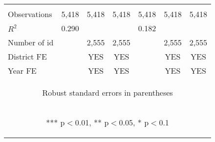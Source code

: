 \begin{center}
\begin{tabular}{lcccccc}
\vspace{4pt} & \begin{footnotesize}\end{footnotesize} & \begin{footnotesize}\end{footnotesize} & \begin{footnotesize}\end{footnotesize} & \begin{footnotesize}\end{footnotesize} & \begin{footnotesize}\end{footnotesize} & \begin{footnotesize}\end{footnotesize} \\
Observations & 5,418 & 5,418 & 5,418 & 5,418 & 5,418 & 5,418 \\
$R^2$ & 0.290 &  &  & 0.182 &  &  \\
Number of id &  & 2,555 & 2,555 &  & 2,555 & 2,555 \\
District FE &  & YES & YES &  & YES & YES \\
 Year FE &  & YES & YES &  & YES & YES \\ \hline
\multicolumn{7}{c}{\begin{footnotesize} Robust standard errors in parentheses\end{footnotesize}} \\
\multicolumn{7}{c}{\begin{footnotesize} *** p$<$0.01, ** p$<$0.05, * p$<$0.1\end{footnotesize}} \\
\end{tabular}
\end{center}
